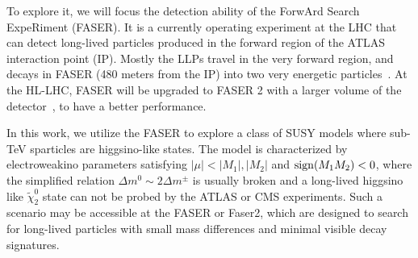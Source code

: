\documentclass[letterpaper,11pt]{article}
\def\to{\rightarrow}
\begin{document}
To explore it, we will focus the detection ability of the ForwArd Search ExpeRiment (FASER). It is a currently operating experiment at the LHC that can detect long-lived particles produced in the forward region of the ATLAS interaction point (IP). Mostly the LLPs travel in the very forward region,  and decays in FASER (480 meters from the IP) into two very energetic particles~\cite{Feng:2017uoz,FASER:2018ceo, FASER:2018bac, FASER:2022hcn, FASER:2021ljd,FASER:2021cpr}. At the HL-LHC,  FASER will be upgraded to FASER 2 with a larger volume of the detector~\cite{FASER:2018eoc,Anchordoqui:2021ghd,Feng:2022inv}, to have a better performance. 


\par In this work, we utilize the FASER to explore a class of SUSY models where sub-TeV sparticles are higgsino-like states. The model is characterized by electroweakino parameters satisfying $|\mu| < |M_1|, |M_2|$ and ${\rm sign}(M_1 M_2) < 0$, where the simplified relation $\Delta m^0 \sim 2 \Delta m^\pm$ is usually broken and a long-lived higgsino like $\tilde{\chi}_2^0$ state can not be probed by the ATLAS or CMS experiments. Such a scenario may be accessible at the FASER or Faser2, which are designed to search for long-lived particles with small mass differences and minimal visible decay signatures. 
\end{document}
